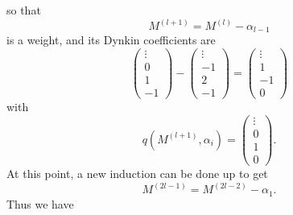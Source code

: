 so that
\begin{equation}
	M^{(l+1)}=M^{(l)}-\alpha_{l-1}
\end{equation}
is a weight, and its Dynkin coefficients are
\begin{equation}
	\begin{pmatrix}
\vdots\\0\\1\\-1
\end{pmatrix}
-
\begin{pmatrix}
\vdots\\-1\\2\\-1
\end{pmatrix}
=
\begin{pmatrix}
\vdots\\1\\-1\\0
\end{pmatrix}
\end{equation}
with
\begin{equation}
	q(M^{(l+1)},\alpha_i)=
\begin{pmatrix}
\vdots\\0\\1\\0
\end{pmatrix}.
\end{equation}
At this point, a new induction can be done up to get
\begin{equation}
	M^{(2l-1)}=M^{(2l-2)}-\alpha_1.
\end{equation}
Thus we have

